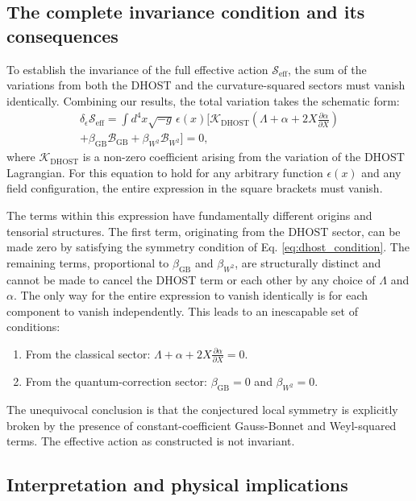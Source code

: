 \documentclass[twocolumn]{aastex631}
\begin{document}
\subsection{The complete invariance condition and its consequences}

To establish the invariance of the full effective action $\mathcal{S}_{\text{eff}}$, the sum of the variations from both the DHOST and the curvature-squared sectors must vanish identically. Combining our results, the total variation takes the schematic form:
\begin{multline}
\delta_\epsilon \mathcal{S}_{\text{eff}} = \int d^4x \sqrt{-g} \, \epsilon(x) \bigg[ \mathcal{K}_{\text{DHOST}} \left( \Lambda + \alpha + 2X \frac{\partial \alpha}{\partial X} \right) \\
+ \beta_{\text{GB}} \mathcal{B}_{\text{GB}} + \beta_{W^2} \mathcal{B}_{W^2} \bigg] = 0,
\end{multline}
where $\mathcal{K}_{\text{DHOST}}$ is a non-zero coefficient arising from the variation of the DHOST Lagrangian. For this equation to hold for any arbitrary function $\epsilon(x)$ and any field configuration, the entire expression in the square brackets must vanish.

The terms within this expression have fundamentally different origins and tensorial structures. The first term, originating from the DHOST sector, can be made zero by satisfying the symmetry condition of Eq. \eqref{eq:dhost_condition}. The remaining terms, proportional to $\beta_{\text{GB}}$ and $\beta_{W^2}$, are structurally distinct and cannot be made to cancel the DHOST term or each other by any choice of $\Lambda$ and $\alpha$. The only way for the entire expression to vanish identically is for each component to vanish independently. This leads to an inescapable set of conditions:
\begin{enumerate}
    \item From the classical sector: $\Lambda + \alpha + 2X \frac{\partial \alpha}{\partial X} = 0$.
    \item From the quantum-correction sector: $\beta_{\text{GB}} = 0$ and $\beta_{W^2} = 0$.
\end{enumerate}
The unequivocal conclusion is that the conjectured local symmetry is explicitly broken by the presence of constant-coefficient Gauss-Bonnet and Weyl-squared terms. The effective action as constructed is not invariant.

\subsection{Interpretation and physical implications}
\end{document}
